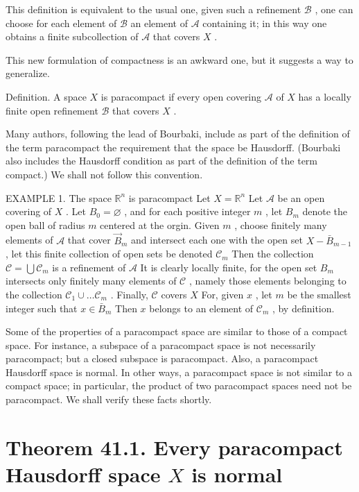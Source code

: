 \documentclass[10pt]{article}
\begin{document}
This definition is equivalent to the usual one, given such a refinement \(\mathcal{B}\) , one can choose for each element of \(\mathcal{B}\) an element of \(\mathcal{A}\) containing it; in this way one obtains a finite subcollection of \(\mathcal{A}\) that covers \(X\) .

This new formulation of compactness is an awkward one, but it suggests a way to generalize.

Definition. A space \(X\) is paracompact if every open covering \(\mathcal{A}\) of \(X\) has a locally finite open refinement \(\mathcal{B}\) that covers \(X\) .

Many authors, following the lead of Bourbaki, include as part of the definition of the term paracompact the requirement that the space be Hausdorff. (Bourbaki also includes the Hausdorff condition as part of the definition of the term compact.) We shall not follow this convention.

EXAMPLE 1. The space \({\mathbb{R}}^{n}\) is paracompact Let \(X = {\mathbb{R}}^{n}\) Let \(\mathcal{A}\) be an open covering of \(X\) . Let \({B}_{0} = \varnothing\) , and for each positive integer \(m\) , let \({B}_{m}\) denote the open ball of radius \(m\) centered at the orgin. Given \(m\) , choose finitely many elements of \(\mathcal{A}\) that cover \({\overrightarrow{B}}_{m}\) and intersect each one with the open set \(X - {\bar{B}}_{m - 1}\) , let this finite collection of open sets be denoted \({\mathcal{C}}_{m}\) Then the collection \(\mathcal{C} = \bigcup {\mathcal{C}}_{m}\) is a refinement of \(\mathcal{A}\) It is clearly locally finite, for the open set \({B}_{m}\) intersects only finitely many elements of \(\mathcal{C}\) , namely those elements belonging to the collection \({\mathcal{C}}_{1} \cup  \ldots {\mathcal{C}}_{m}\) . Finally, \(\mathcal{C}\) covers \(X\) For, given \(x\) , let \(m\) be the smallest integer such that \(x \in  {\bar{B}}_{m}\) Then \(x\) belongs to an element of \({\mathcal{C}}_{m}\) , by definition.

Some of the properties of a paracompact space are similar to those of a compact space. For instance, a subspace of a paracompact space is not necessarily paracompact; but a closed subspace is paracompact. Also, a paracompact Hausdorff space is normal. In other ways, a paracompact space is not similar to a compact space; in particular, the product of two paracompact spaces need not be paracompact. We shall verify these facts shortly.

\section*{Theorem 41.1. Every paracompact Hausdorff space \(X\) is normal}
\end{document}
